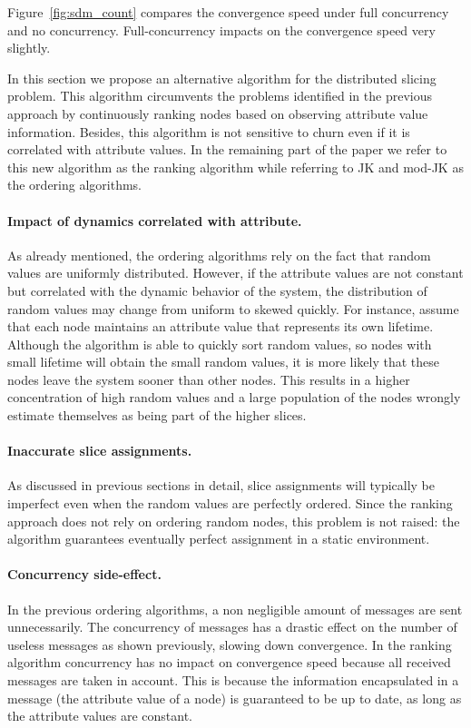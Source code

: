 \documentclass[times,10pt,twocolumn]{article}
\begin{document}
Figure~\ref{fig:sdm_count} compares the convergence speed under full concurrency 
and no concurrency.  
Full-concurrency 
impacts on the convergence speed very slightly.

\label{sec:ranking}
\label{dynamicranking}
In this section we propose an alternative algorithm for the distributed slicing
problem. This algorithm circumvents the problems identified in
the previous approach by continuously ranking nodes based on observing attribute value
information. 
Besides, this algorithm
is not sensitive to churn even if it is correlated with attribute values. 
In the remaining part of the paper we refer to this new algorithm 
as the ranking algorithm while referring to JK and mod-JK as the ordering algorithms.


\paragraph{Impact of dynamics correlated with attribute.}
As already mentioned, the ordering algorithms
rely on the fact that random values are uniformly distributed.
However, if the attribute values are not constant but correlated with
the dynamic behavior of the system, the distribution of random values may change
from uniform to  skewed quickly.
For instance, assume that each node maintains an attribute
value that represents its own lifetime. 
Although the algorithm is able to quickly sort random values, so
nodes with small lifetime will obtain the small random values, it
is more likely that these nodes leave the system sooner than other nodes.
This results in
a higher concentration of high random values and a large population of the nodes
wrongly estimate themselves as being part of the higher slices.

\paragraph{Inaccurate slice assignments.}

As discussed in previous sections in detail, slice assignments will
typically be imperfect even when the random values are perfectly
ordered.
Since the ranking approach does not rely on ordering random nodes,
this problem is not raised: the algorithm guarantees eventually
perfect assignment in a static environment.

\paragraph{Concurrency side-effect.}
In the previous ordering algorithms, a non negligible amount of messages are sent unnecessarily.
The concurrency of messages has a drastic effect on the number of useless messages
as shown previously, slowing down convergence.
In the ranking algorithm
concurrency has no impact on convergence speed because all 
received messages are taken in account. 
This is because the information encapsulated in a message (the attribute value of a node)
is guaranteed to be up to date, as long as  the attribute values are constant.
\end{document}
